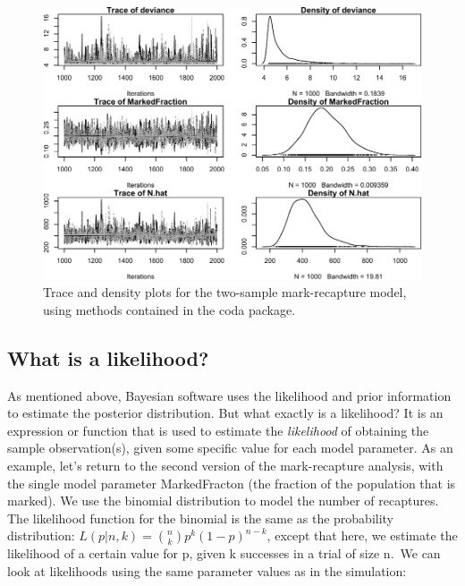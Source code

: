 \documentclass[
]{krantz}
\begin{document}
\begin{figure}
\includegraphics[width=0.9\linewidth]{bookdown_files/figure-latex/TracePlots-1} \caption{Trace and density plots for the two-sample mark-recapture model, using methods contained in the coda package.}\label{fig:TracePlots}
\end{figure}

\hypertarget{Likelihood}{%
\subsection{What is a likelihood?}\label{Likelihood}}

As mentioned above, Bayesian software uses the likelihood and prior information to estimate the posterior distribution. But what exactly is a likelihood? It is an expression or function that is used to estimate the \emph{likelihood} of obtaining the sample observation(s), given some specific value for each model parameter. As an example, let's return to the second version of the mark-recapture analysis, with the single model parameter MarkedFracton (the fraction of the population that is marked). We use the binomial distribution to model the number of recaptures. The likelihood function for the binomial is the same as the probability distribution: \(L(p | n, k) = {n \choose k} p^{k} (1-p)^{n-k}\), except that here, we estimate the likelihood of a certain value for p, given k successes in a trial of size n.~We can look at likelihoods using the same parameter values as in the simulation:
\end{document}
